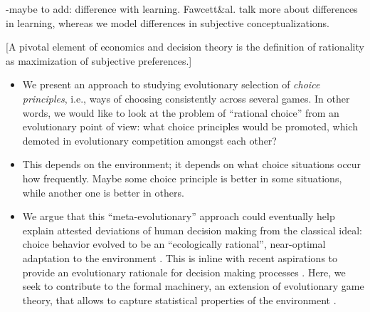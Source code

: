 \documentclass[fleqn,reqno,11pt]{article}
\begin{document}
-maybe to add: difference with learning. Fawcett\&al. talk more about differences in learning, whereas we model differences in subjective conceptualizations.


[A pivotal element of economics and decision theory is the definition of rationality as
maximization of subjective preferences.]



\begin{itemize}
\item We present an approach to studying evolutionary selection of \emph{choice principles},
  i.e., ways of choosing consistently across several games. In other words, we would like to
  look at the problem of ``rational choice'' from an evolutionary point of view: what choice
  principles would be promoted, which demoted in evolutionary competition amongst each other?

\item This depends on the environment; it depends on what choice situations occur how
  frequently. Maybe some choice principle is better in some situations, while another one is
  better in others. 


\item We argue that this ``meta-evolutionary'' approach could eventually help explain attested
  deviations of human decision making from the classical ideal: choice behavior evolved to be
  an ``ecologically rational'', near-optimal adaptation to the environment
  \citep{Anderson1990:The-Adaptive-Ch,Anderson1991:Is-human-cognit,GigerenzerGoldstein1996:Reasoning-the-F,ChaterOaksford2000:The-Rational-An}. This
  is inline with recent aspirations to provide an evolutionary rationale for decision making
  processes
  \citep[e.g.][]{HammersteinStevens2012:Six-Reasons-for,FawcettHamblin2013:Exposing-the-be}. Here,
  we seek to contribute to the formal machinery, an extension of evolutionary game theory, that
  allows to capture statistical properties of the environment
  \citep[cf.][]{McNamara2013:Towards-a-Riche}.
\end{itemize}
\end{document}
